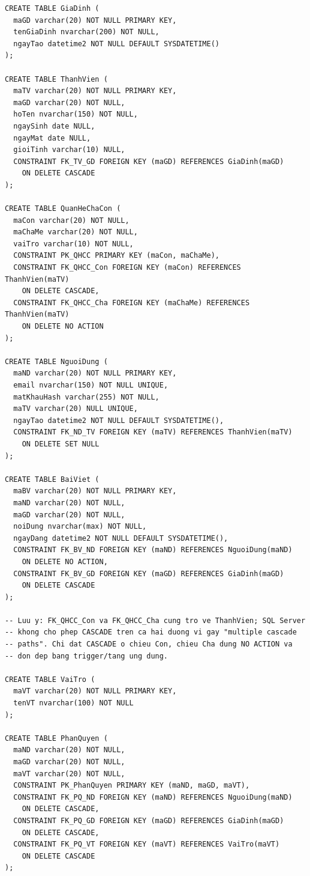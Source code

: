 \begin{sqlcode}
\begin{verbatim}
CREATE TABLE GiaDinh (
  maGD varchar(20) NOT NULL PRIMARY KEY,
  tenGiaDinh nvarchar(200) NOT NULL,
  ngayTao datetime2 NOT NULL DEFAULT SYSDATETIME()
);

CREATE TABLE ThanhVien (
  maTV varchar(20) NOT NULL PRIMARY KEY,
  maGD varchar(20) NOT NULL,
  hoTen nvarchar(150) NOT NULL,
  ngaySinh date NULL,
  ngayMat date NULL,
  gioiTinh varchar(10) NULL,
  CONSTRAINT FK_TV_GD FOREIGN KEY (maGD) REFERENCES GiaDinh(maGD)
    ON DELETE CASCADE
);

CREATE TABLE QuanHeChaCon (
  maCon varchar(20) NOT NULL,
  maChaMe varchar(20) NOT NULL,
  vaiTro varchar(10) NOT NULL,
  CONSTRAINT PK_QHCC PRIMARY KEY (maCon, maChaMe),
  CONSTRAINT FK_QHCC_Con FOREIGN KEY (maCon) REFERENCES ThanhVien(maTV)
    ON DELETE CASCADE,
  CONSTRAINT FK_QHCC_Cha FOREIGN KEY (maChaMe) REFERENCES ThanhVien(maTV)
    ON DELETE NO ACTION
);

CREATE TABLE NguoiDung (
  maND varchar(20) NOT NULL PRIMARY KEY,
  email nvarchar(150) NOT NULL UNIQUE,
  matKhauHash varchar(255) NOT NULL,
  maTV varchar(20) NULL UNIQUE,
  ngayTao datetime2 NOT NULL DEFAULT SYSDATETIME(),
  CONSTRAINT FK_ND_TV FOREIGN KEY (maTV) REFERENCES ThanhVien(maTV)
    ON DELETE SET NULL
);

CREATE TABLE BaiViet (
  maBV varchar(20) NOT NULL PRIMARY KEY,
  maND varchar(20) NOT NULL,
  maGD varchar(20) NOT NULL,
  noiDung nvarchar(max) NOT NULL,
  ngayDang datetime2 NOT NULL DEFAULT SYSDATETIME(),
  CONSTRAINT FK_BV_ND FOREIGN KEY (maND) REFERENCES NguoiDung(maND)
    ON DELETE NO ACTION,
  CONSTRAINT FK_BV_GD FOREIGN KEY (maGD) REFERENCES GiaDinh(maGD)
    ON DELETE CASCADE
);

-- Luu y: FK_QHCC_Con va FK_QHCC_Cha cung tro ve ThanhVien; SQL Server
-- khong cho phep CASCADE tren ca hai duong vi gay "multiple cascade
-- paths". Chi dat CASCADE o chieu Con, chieu Cha dung NO ACTION va
-- don dep bang trigger/tang ung dung.

CREATE TABLE VaiTro (
  maVT varchar(20) NOT NULL PRIMARY KEY,
  tenVT nvarchar(100) NOT NULL
);

CREATE TABLE PhanQuyen (
  maND varchar(20) NOT NULL,
  maGD varchar(20) NOT NULL,
  maVT varchar(20) NOT NULL,
  CONSTRAINT PK_PhanQuyen PRIMARY KEY (maND, maGD, maVT),
  CONSTRAINT FK_PQ_ND FOREIGN KEY (maND) REFERENCES NguoiDung(maND)
    ON DELETE CASCADE,
  CONSTRAINT FK_PQ_GD FOREIGN KEY (maGD) REFERENCES GiaDinh(maGD)
    ON DELETE CASCADE,
  CONSTRAINT FK_PQ_VT FOREIGN KEY (maVT) REFERENCES VaiTro(maVT)
    ON DELETE CASCADE
);


\end{verbatim}
\end{sqlcode}
